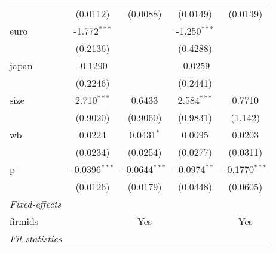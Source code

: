 \begin{tabular}{lcccc}
                                & (0.0112)                                    & (0.0088)               & (0.0149)              & (0.0139)             \\
   euro                         & -1.772$^{***}$                              &                        & -1.250$^{***}$        &                      \\
                                & (0.2136)                                    &                        & (0.4288)              &                      \\
   japan                        & -0.1290                                     &                        & -0.0259               &                      \\
                                & (0.2246)                                    &                        & (0.2441)              &                      \\
   size                         & 2.710$^{***}$                               & 0.6433                 & 2.584$^{***}$         & 0.7710               \\
                                & (0.9020)                                    & (0.9060)               & (0.9831)              & (1.142)              \\
   wb                           & 0.0224                                      & 0.0431$^{*}$           & 0.0095                & 0.0203               \\
                                & (0.0234)                                    & (0.0254)               & (0.0277)              & (0.0311)             \\
   p                            & -0.0396$^{***}$                             & -0.0644$^{***}$        & -0.0974$^{**}$        & -0.1770$^{***}$      \\
                                & (0.0126)                                    & (0.0179)               & (0.0448)              & (0.0605)             \\
   \midrule
   \emph{Fixed-effects}                                                                                                                               \\
   firmids                      &                                             & Yes                    &                       & Yes                  \\
   \midrule
   \emph{Fit statistics}                                                                                                                              \\

\end{tabular}
